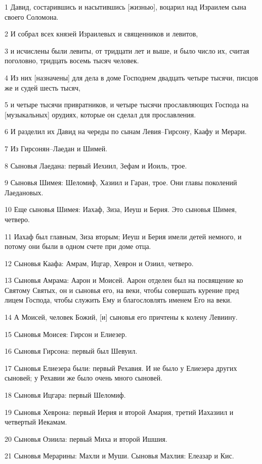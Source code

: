 \par 1 Давид, состарившись и насытившись [жизнью], воцарил над Израилем сына своего Соломона.
\par 2 И собрал всех князей Израилевых и священников и левитов,
\par 3 и исчислены были левиты, от тридцати лет и выше, и было число их, считая поголовно, тридцать восемь тысяч человек.
\par 4 Из них [назначены] для дела в доме Господнем двадцать четыре тысячи, писцов же и судей шесть тысяч,
\par 5 и четыре тысячи привратников, и четыре тысячи прославляющих Господа на [музыкальных] орудиях, которые он сделал для прославления.
\par 6 И разделил их Давид на череды по сынам Левия--Гирсону, Каафу и Мерари.
\par 7 Из Гирсонян--Лаедан и Шимей.
\par 8 Сыновья Лаедана: первый Иехиил, Зефам и Иоиль, трое.
\par 9 Сыновья Шимея: Шеломиф, Хазиил и Гаран, трое. Они главы поколений Лаедановых.
\par 10 Еще сыновья Шимея: Иахаф, Зиза, Иеуш и Берия. Это сыновья Шимея, четверо.
\par 11 Иахаф был главным, Зиза вторым; Иеуш и Берия имели детей немного, и потому они были в одном счете при доме отца.
\par 12 Сыновья Каафа: Амрам, Ицгар, Хеврон и Озиил, четверо.
\par 13 Сыновья Амрама: Аарон и Моисей. Аарон отделен был на посвящение ко Святому Святых, он и сыновья его, на веки, чтобы совершать курение пред лицем Господа, чтобы служить Ему и благословлять именем Его на веки.
\par 14 А Моисей, человек Божий, [и] сыновья его причтены к колену Левиину.
\par 15 Сыновья Моисея: Гирсон и Елиезер.
\par 16 Сыновья Гирсона: первый был Шевуил.
\par 17 Сыновья Елиезера были: первый Рехавия. И не было у Елиезера других сыновей; у Рехавии же было очень много сыновей.
\par 18 Сыновья Ицгара: первый Шеломиф.
\par 19 Сыновья Хеврона: первый Иерия и второй Амария, третий Иахазиил и четвертый Иекамам.
\par 20 Сыновья Озиила: первый Миха и второй Ишшия.
\par 21 Сыновья Мерарины: Махли и Муши. Сыновья Махлия: Елеазар и Кис.
